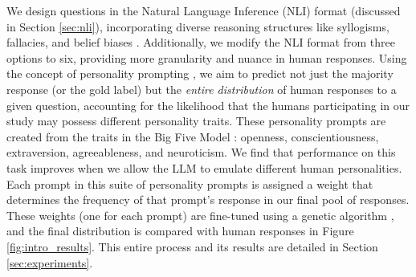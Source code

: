 
    We design questions in the Natural Language Inference (NLI) format (discussed in Section \ref{sec:nli}), incorporating diverse reasoning structures like syllogisms, fallacies, and belief biases \citep{evans_conflict_1983, sap_annotators_2022, yang_belief_2023}. Additionally, we modify the NLI format from three options to six, providing more granularity and nuance in human responses. Using the concept of personality prompting \citep{de_paoli_improved_2023, gu_effectiveness_2023, kamruzzaman_prompting_2024}, we aim to predict not just the majority response (or the gold label) but the \textit{entire distribution} of human responses to a given question, accounting for the likelihood that the humans participating in our study may possess different personality traits. These personality prompts are created from the traits in the Big Five Model \citep{roccas_big_2002}: openness, conscientiousness, extraversion, agreeableness, and neuroticism. We find that performance on this task improves when we allow the LLM to emulate different human personalities. Each prompt in this suite of personality prompts is assigned a weight that determines the frequency of that prompt's response in our final pool of responses. These weights (one for each prompt) are fine-tuned using a genetic algorithm \citep{mitchell_introduction_1996}, and the final distribution is compared with human responses in Figure \ref{fig:intro_results}. This entire process and its results are detailed in Section \ref{sec:experiments}.

